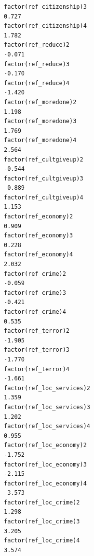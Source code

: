 \documentclass[
]{article}
\begin{document}
\begin{table}
\begin{minipage}[t]{\linewidth}
{\begin{verbatim}
factor(ref_citizenship)3                                                            0.727
factor(ref_citizenship)4                                                            1.782
factor(ref_reduce)2                                                                -0.071
factor(ref_reduce)3                                                                -0.170
factor(ref_reduce)4                                                                -1.420
factor(ref_moredone)2                                                               1.198
factor(ref_moredone)3                                                               1.769
factor(ref_moredone)4                                                               2.564
factor(ref_cultgiveup)2                                                            -0.544
factor(ref_cultgiveup)3                                                            -0.889
factor(ref_cultgiveup)4                                                             1.153
factor(ref_economy)2                                                                0.909
factor(ref_economy)3                                                                0.228
factor(ref_economy)4                                                                2.032
factor(ref_crime)2                                                                 -0.059
factor(ref_crime)3                                                                 -0.421
factor(ref_crime)4                                                                  0.535
factor(ref_terror)2                                                                -1.905
factor(ref_terror)3                                                                -1.770
factor(ref_terror)4                                                                -1.661
factor(ref_loc_services)2                                                           1.359
factor(ref_loc_services)3                                                           1.202
factor(ref_loc_services)4                                                           0.955
factor(ref_loc_economy)2                                                           -1.752
factor(ref_loc_economy)3                                                           -2.115
factor(ref_loc_economy)4                                                           -3.573
factor(ref_loc_crime)2                                                              1.298
factor(ref_loc_crime)3                                                              3.205
factor(ref_loc_crime)4                                                              3.574

\end{verbatim}}
\end{minipage}
\end{table}
\end{document}
